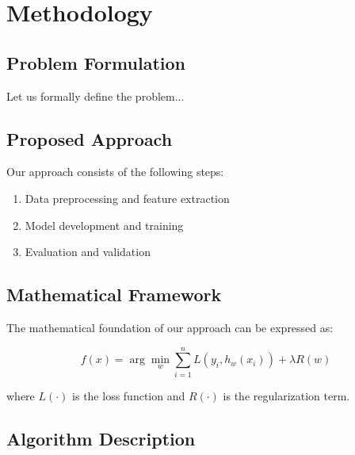 \section{Methodology}
\label{sec:methodology}


\subsection{Problem Formulation}

Let us formally define the problem...

\subsection{Proposed Approach}

Our approach consists of the following steps:

\begin{enumerate}
    \item Data preprocessing and feature extraction
    \item Model development and training
    \item Evaluation and validation
\end{enumerate}

\subsection{Mathematical Framework}

The mathematical foundation of our approach can be expressed as:

\begin{equation}
f(x) = \arg\min_{w} \sum_{i=1}^{n} L(y_i, h_w(x_i)) + \lambda R(w)
\label{eq:objective}
\end{equation}

where $L(\cdot)$ is the loss function and $R(\cdot)$ is the regularization term.

\subsection{Algorithm Description}

